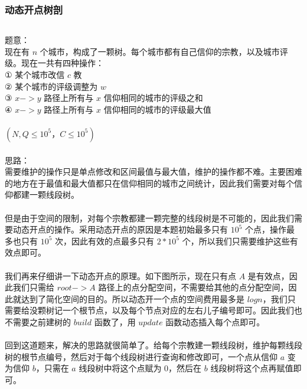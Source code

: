 \documentclass[twoside]{article}
\begin{document}
\subsubsection{动态开点树剖}
\begin{lstlisting}
\end{lstlisting}
题意：\\
现在有 $n$ 个城市，构成了一颗树。每个城市都有自己信仰的宗教，以及城市评级。现在一共有四种操作：\\
$①$ 某个城市改信 $c$ 教\\
$②$ 某个城市的评级调整为 $w$\\
$③$ $x->y$ 路径上所有与 $x$ 信仰相同的城市的评级之和\\
$④$ $x->y$ 路径上所有与 $x$ 信仰相同的城市的评级最大值\\
\\
$(N,Q \leq 10^5，C \leq 10^5)$\\
\\
思路：\\
需要维护的操作只是单点修改和区间最值与最大值，维护的操作都不难。主要困难的地方在于最值和最大值都只在信仰相同的城市之间统计，因此我们需要对每个信仰都建一颗线段树。\\
\\
但是由于空间的限制，对每个宗教都建一颗完整的线段树是不可能的，因此我们需要动态开点的操作。采用动态开点的原因是本题初始最多只有 $10^5$ 个点，操作最多也只有 $10^5$ 次，因此有效的点最多只有 $2*10^5$ 个，所以我们只需要维护这些有效点即可。\\
\\
我们再来仔细讲一下动态开点的原理。如下图所示，现在只有点 $A$ 是有效点，因此我们只需给 $root->A$ 路径上的点分配空间，不需要给其他的点分配空间，因此就达到了简化空间的目的。所以动态开一个点的空间费用最多是 $logn$，我们只需要给没颗树记一个根节点，以及每个节点对应的左右儿子编号即可。因此我们也不需要之前建树的 $build$ 函数了，用 $update$ 函数动态插入每个点即可。\\
\\
回到这道题来，解决的思路就很简单了。给每个宗教建一颗线段树，维护每颗线段树的根节点编号，然后对于每个线段树进行查询和修改即可，一个点从信仰 $a$ 变为信仰 $b$，只需在 $a$ 线段树中将这个点赋为 $0$，然后在 $b$ 线段树将这个点再赋值即可。\\
\end{document}
